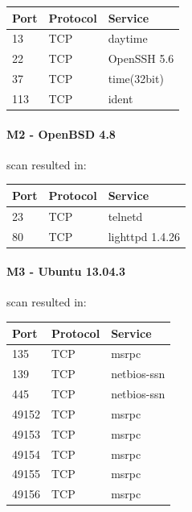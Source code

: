 	\begin{table}[h]
	\begin{tabular}{|l|l|l|}
	\hline
	\textbf{Port}         & \textbf{Protocol} & \textbf{Service}  \\ \hline
	13 	&  TCP & daytime  \\ \hline
	22  & TCP & OpenSSH 5.6  \\ \hline
	37  &  TCP & time(32bit)  \\ \hline
	113  & TCP & ident  \\ \hline
	
	\end{tabular}
	\end{table}
\paragraph{M2 - OpenBSD 4.8}
scan resulted in:

	\begin{table}[h]
	\begin{tabular}{|l|l|l|}
	\hline
	\textbf{Port}         & \textbf{Protocol} & \textbf{Service}  \\ \hline
	23  &  TCP & telnetd  \\ \hline
	80   & TCP & lighttpd 1.4.26  \\ \hline
	\end{tabular}
	\end{table}

\paragraph{M3 - Ubuntu 13.04.3}
scan resulted in:

	\begin{table}[h]
	\begin{tabular}{|l|l|l|}
	\hline
	\textbf{Port}         & \textbf{Protocol} & \textbf{Service}  \\ \hline
	135 	& TCP & msrpc  \\ \hline
	139  	& TCP & netbios-ssn  \\ \hline
	445  	& TCP & netbios-ssn  \\ \hline
	49152 	& TCP & msrpc  \\ \hline
	49153 	& TCP & msrpc  \\ \hline
	49154  	& TCP & msrpc  \\ \hline
	49155  	& TCP & msrpc  \\ \hline
	49156 	& TCP & msrpc  \\ \hline
	\end{tabular}
	\end{table}

